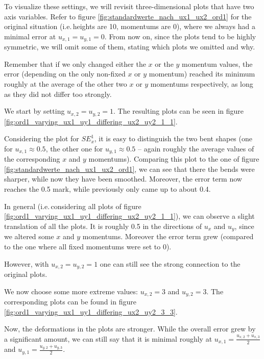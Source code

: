 \documentclass[a4paper, twoside]{article}
\begin{document}


To visualize these settings, we will revisit three-dimensional plots that have two axis variables. Refer to figure \ref{fig:standardwerte_nach_ux1_ux2_ord1} for the original situation (i.e.\,heights are 10, momentums are 0), where we always had a minimal error at $u_{x,1}=u_{y,1}=0$. From now on, since the plots tend to be highly symmetric, we will omit some of them, stating which plots we omitted and why.

Remember that if we only changed either the $x$ or the $y$ momentum values, the error (depending on the only non-fixed $x$ or $y$ momentum) reached its minimum roughly at the average of the other two $x$ or $y$ momentums respectively, as long as they did not differ too strongly.

We start by setting $u_{x,2}=u_{y,2}=1$. The resulting plots can be seen in figure \ref{fig:ord1_varying_ux1_uy1_differing_ux2_uy2_1_1}.

Considering the plot for $SE_x^1$, it is easy to distinguish the two bent shapes (one for $u_{x,1}\approx 0.5$, the other one for $u_{y,1}\approx 0.5$ -- again roughly the average values of the corresponding $x$ and $y$ momentums). Comparing this plot to the one of figure \ref{fig:standardwerte_nach_ux1_ux2_ord1}, we can see that there the bends were sharper, while now they have been smoothed. Moreover, the error term now reaches the 0.5 mark, while previously only came up to about 0.4.

In general (i.e.\,considering all plots of figure \ref{fig:ord1_varying_ux1_uy1_differing_ux2_uy2_1_1}), we can observe a slight translation of all the plots. It is roughly 0.5 in the directions of $u_x$ and $u_y$, since we altered some $x$ and $y$ momentums. Moreover the error term grew (compared to the one where all fixed momentums were set to 0).

However, with $u_{x,2}=u_{y,2}=1$ one can still see the strong connection to the original plots.

We now choose some more extreme values: $u_{x,2}=3$ and $u_{y,2}=3$. The corresponding plots can be found in figure \ref{fig:ord1_varying_ux1_uy1_differing_ux2_uy2_3_3}.



Now, the deformations in the plots are stronger. While the overall error grew by a significant amount, we can still say that it is minimal roughly at $u_{x,1}=\frac{u_{x,2}+u_{x,3}}{2}$ and $u_{y,1}=\frac{u_{y,2}+u_{y,3}}{2}$.
\end{document}
